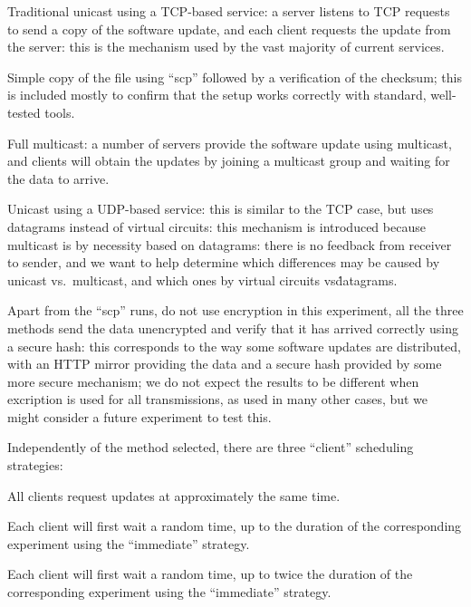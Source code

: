 \documentclass[a4paper,11pt,twocolumn]{article}
\begin{document}
\begin{list}{multicast:}{}
\item[tcp:]
Traditional unicast using a TCP-based service: a
server listens to TCP requests to send a copy of the software
update, and each client requests
the update from the server: this is the mechanism used by the vast
majority of current services.
\item[scp:]
Simple copy of the file using ``scp'' followed by a verification
of the checksum; this is included mostly to confirm that the setup
works correctly with standard, well-tested tools.
\item[multicast:]
Full multicast: a number of servers provide the software
update using multicast, and clients will obtain the updates by
joining a multicast group and waiting for the data to arrive.
\item[udp:]
Unicast using a UDP-based service: this is similar to the
TCP case, but uses datagrams instead of virtual circuits: this
mechanism is introduced because multicast is by necessity based
on datagrams: there is no feedback from receiver to sender, and
we want to help determine which differences may be caused by
unicast vs.\ multicast, and which ones by virtual circuits vs\.
datagrams.
\end{list}

Apart from the ``scp'' runs, do not use encryption in this experiment,
all the three methods send the data unencrypted and verify that it
has arrived correctly using a secure hash: this corresponds to the way
some software updates are distributed, with an HTTP mirror providing
the data and a secure hash provided by some more secure mechanism; we
do not expect the results to be different when excription is used for
all transmissions, as used in many other cases, but we might consider
a future experiment to test this.

Independently of the method selected, there are three ``client''
scheduling strategies:

\begin{list}{immediate:}{}
\item[immediate:]
All clients request updates at approximately the same time.
\item[random:]
Each client will first wait a random time, up to the duration
of the corresponding experiment using the ``immediate'' strategy.
\item[random2:]
Each client will first wait a random time, up to twice the duration
of the corresponding experiment using the ``immediate'' strategy.
\end{list}
\end{document}
